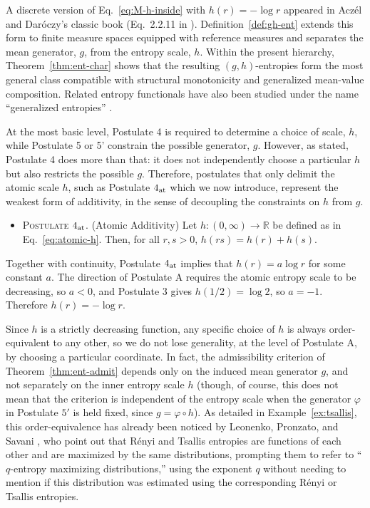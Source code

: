 \documentclass[reqno]{amsart}
\begin{document}
\begin{remark}
    A discrete version of Eq.~\eqref{eq:M-h-inside} with $h(r) = - \log r$ appeared in Acz{\'e}l and Dar{\'o}czy's classic book (Eq.~2.2.11 in \cite{AczelDaroczy75}). Definition~\ref{def:gh-ent} extends this form to finite measure spaces equipped with reference measures and separates the mean generator, $g$, from the entropy scale, $h$. Within the present hierarchy, Theorem~\ref{thm:ent-char} shows that the resulting $(g,h)$-entropies form the most general class compatible with structural monotonicity and generalized mean-value composition. Related entropy functionals have also been studied under the name ``generalized entropies'' \cite{GrunDaw04, DupKra12, AmiBalHer18, BalPal20}.
\end{remark}

At the most basic level, Postulate 4 is required to determine a choice of scale, $h$, while Postulate 5 or 5' constrain the possible generator, $g$. However, as stated, Postulate 4 does more than that: it does not independently choose a particular $h$ but also restricts the possible $g$. Therefore, postulates that only delimit the atomic scale $h$, such as Postulate $4_{\rm at}$ which we now introduce, represent the weakest form of additivity, in the sense of decoupling the constraints on $h$ from $g$. 
\begin{itemize}
    \item[] \textsc{Postulate $4_{\rm at}$.} (Atomic Additivity) \quad
    Let $h:(0,\infty)\to\mathbb{R}$ be defined as in Eq.~\ref{eq:atomic-h}. Then, for all $r,s>0$, \; $h(rs)=h(r)+h(s)$.
\end{itemize}



\begin{remark}
\label{rem:h-log}
Together with continuity, Postulate $4_{\rm at}$ implies that
$h(r)=a\log r $
for some constant $a$. The direction of Postulate A requires the atomic
entropy scale to be decreasing, so $a<0$, and Postulate 3 gives $h(1/2)=\log 2$,
so $a=-1$. Therefore $h(r)=-\log r$.
\end{remark}
Since $h$ is a strictly decreasing function, any specific choice of $h$ is always order-equivalent to any other, so we do not lose generality, at the level of Postulate A, by choosing a particular coordinate. 
In fact, the admissibility criterion of Theorem~\ref{thm:ent-admit} depends only on the induced mean generator $g$, and not separately on the inner entropy scale $h$ (though, of course, this does not mean that the criterion is independent of the entropy scale when the
generator $\varphi$ in Postulate $5'$ is held fixed, since
$g=\varphi\circ h$).
As detailed in Example~\ref{ex:tsallis}, this order-equivalence has already been noticed by Leonenko, Pronzato, and Savani \cite{Leo08}, who point out that R\'enyi and Tsallis entropies are functions of each other and are maximized by the same distributions, prompting them to refer to ``$q$-entropy maximizing distributions,'' using the exponent $q$ without needing to mention if this distribution was estimated using the corresponding R\'enyi or Tsallis entropies. 
\end{document}
